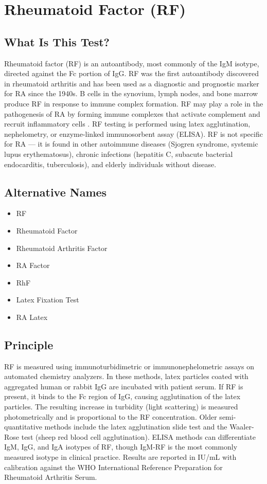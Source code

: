 \chapter{Rheumatoid Factor (RF)}

\section*{What Is This Test?}
Rheumatoid factor (RF) is an autoantibody, most commonly of the IgM isotype, directed against the Fc portion of IgG. RF was the first autoantibody discovered in rheumatoid arthritis and has been used as a diagnostic and prognostic marker for RA since the 1940s. B cells in the synovium, lymph nodes, and bone marrow produce RF in response to immune complex formation. RF may play a role in the pathogenesis of RA by forming immune complexes that activate complement and recruit inflammatory cells \cite{smolen2016rheumatoid}. RF testing is performed using latex agglutination, nephelometry, or enzyme-linked immunosorbent assay (ELISA). RF is not specific for RA --- it is found in other autoimmune diseases (Sjogren syndrome, systemic lupus erythematosus), chronic infections (hepatitis C, subacute bacterial endocarditis, tuberculosis), and elderly individuals without disease.

\section*{Alternative Names}
\begin{itemize}
  \item RF
  \item Rheumatoid Factor
  \item Rheumatoid Arthritis Factor
  \item RA Factor
  \item RhF
  \item Latex Fixation Test
  \item RA Latex
\end{itemize}
\section*{Principle}
RF is measured using immunoturbidimetric or immunonephelometric assays on automated chemistry analyzers. In these methods, latex particles coated with aggregated human or rabbit IgG are incubated with patient serum. If RF is present, it binds to the Fc region of IgG, causing agglutination of the latex particles. The resulting increase in turbidity (light scattering) is measured photometrically and is proportional to the RF concentration. Older semi-quantitative methods include the latex agglutination slide test and the Waaler-Rose test (sheep red blood cell agglutination). ELISA methods can differentiate IgM, IgG, and IgA isotypes of RF, though IgM-RF is the most commonly measured isotype in clinical practice. Results are reported in IU/mL with calibration against the WHO International Reference Preparation for Rheumatoid Arthritis Serum.

